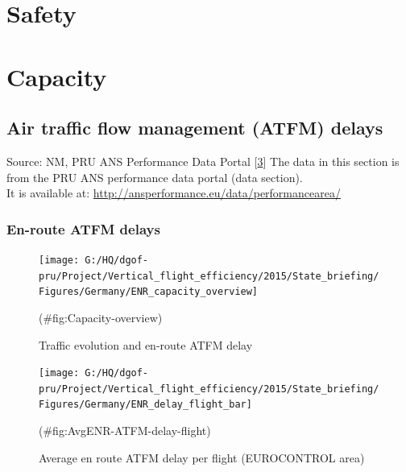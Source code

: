 \documentclass[
]{article}
\begin{document}
\newpage

\hypertarget{safety}{%
\section{Safety}\label{safety}}

\newpage

\hypertarget{capacity}{%
\section{Capacity}\label{capacity}}

\hypertarget{air-traffic-flow-management-atfm-delays}{%
\subsection{Air traffic flow management (ATFM) delays}\label{air-traffic-flow-management-atfm-delays}}

Source: NM, PRU ANS Performance Data Portal {[}\protect\hyperlink{ref-ANS-perf-data-portal}{3}{]}
The data in this section is from the PRU ANS performance data portal (data section).\\
It is available at: \url{http://ansperformance.eu/data/performancearea/}

\hypertarget{en-route-atfm-delays}{%
\subsubsection{En-route ATFM delays}\label{en-route-atfm-delays}}

\begin{figure}

{\centering \texttt{[image: G:/HQ/dgof-pru/Project/Vertical\_flight\_efficiency/2015/State\_briefing/Figures/Germany/ENR\_capacity\_overview]} 

}

\caption{Traffic evolution and en-route ATFM delay}(\#fig:Capacity-overview)
\end{figure}

\begin{figure}

{\centering \texttt{[image: G:/HQ/dgof-pru/Project/Vertical\_flight\_efficiency/2015/State\_briefing/Figures/Germany/ENR\_delay\_flight\_bar]} 

}

\caption{Average en route ATFM delay per flight (EUROCONTROL area)}(\#fig:AvgENR-ATFM-delay-flight)
\end{figure}
\end{document}
